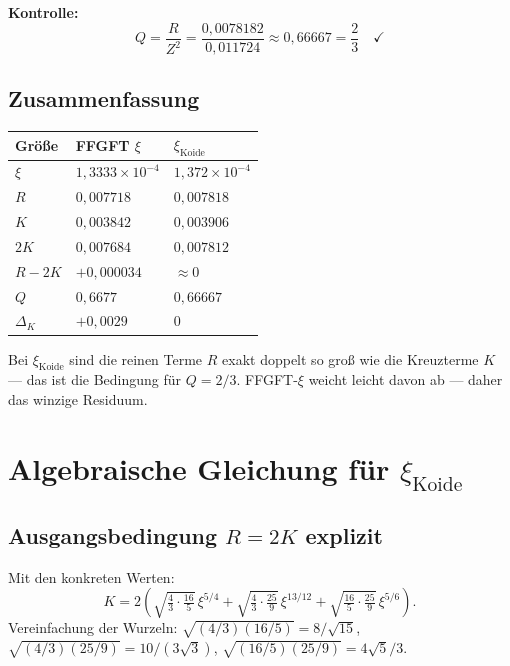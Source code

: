 \textbf{Kontrolle:}
\[
  Q=\frac{R}{Z^2}=\frac{0{,}0078182}{0{,}011724}\approx0{,}66667=\frac{2}{3}\quad\checkmark
\]

\subsection{Zusammenfassung}

\begin{center}
\renewcommand{\arraystretch}{1.4}
\begin{tabular}{lll}
\toprule
\textbf{Größe} & \textbf{FFGFT $\xi$} & \textbf{$\xi_{\text{Koide}}$} \\
\midrule
$\xi$      & $1{,}3333\times10^{-4}$ & $1{,}372\times10^{-4}$ \\
$R$        & $0{,}007718$ & $0{,}007818$ \\
$K$        & $0{,}003842$ & $0{,}003906$ \\
$2K$       & $0{,}007684$ & $0{,}007812$ \\
$R-2K$     & $+0{,}000034$ & $\approx0$ \\
$Q$        & $0{,}6677$ & $0{,}66667$ \\
$\Delta_K$ & $+0{,}0029$ & $0$ \\
\bottomrule
\end{tabular}
\end{center}

Bei $\xi_{\text{Koide}}$ sind die reinen Terme $R$ exakt doppelt so groß
wie die Kreuzterme $K$ — das ist die Bedingung für $Q=2/3$.
FFGFT-$\xi$ weicht leicht davon ab — daher das winzige Residuum.

\section{Algebraische Gleichung für $\xi_{\text{Koide}}$}


\subsection{Ausgangsbedingung $R=2K$ explizit}

Mit den konkreten Werten:
\[
  K = 2\!\left(
    \sqrt{\tfrac{4}{3}\cdot\tfrac{16}{5}}\,\xi^{5/4}
   +\sqrt{\tfrac{4}{3}\cdot\tfrac{25}{9}}\,\xi^{13/12}
   +\sqrt{\tfrac{16}{5}\cdot\tfrac{25}{9}}\,\xi^{5/6}
  \right).
\]
Vereinfachung der Wurzeln:
$\sqrt{(4/3)(16/5)}=8/\sqrt{15}$,
$\sqrt{(4/3)(25/9)}=10/(3\sqrt{3})$,
$\sqrt{(16/5)(25/9)}=4\sqrt{5}/3$.

